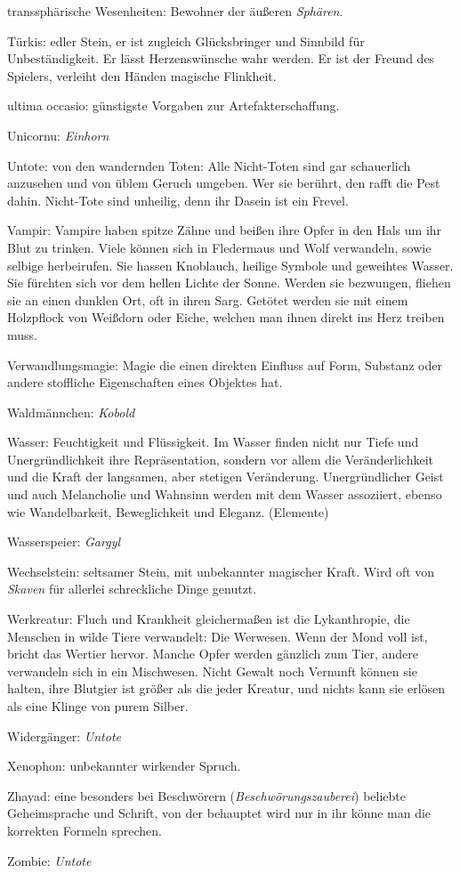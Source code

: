 \documentclass[a5paper,8pt]{book}
\begin{document}
\begin{small}
\begin{description}
 \item transsphärische Wesenheiten: Bewohner der äußeren \textit{Sphären}.
 \item Türkis: edler Stein, er ist zugleich Glücks­bringer und Sinnbild für Unbeständigkeit. Er lässt Herzenswünsche wahr werden. Er ist der Freund des Spielers, verleiht den Händen magische Flinkheit.
 \item ultima occasio: günstigste Vorgaben zur Artefakt­erschaffung.
 \item Unicornu: \textit{Einhorn}
 \item Untote: von den wandernden Toten: Alle Nicht-Toten sind gar schauerlich anzusehen und von üblem Geruch umgeben. Wer sie berührt, den rafft die Pest dahin. Nicht-Tote sind unheilig, denn ihr Dasein ist ein Frevel.
 \item Vampir: Vampire haben spitze Zähne und beißen ihre Opfer in den Hals um ihr Blut zu trinken. Viele können sich in Fledermaus und Wolf verwandeln, sowie selbige herbeirufen. Sie hassen Knoblauch, heilige Symbole und geweihtes Wasser. Sie fürchten sich vor dem hellen Lichte der Sonne. Werden sie bezwungen, fliehen sie an einen dunklen Ort, oft in ihren Sarg. Getötet werden sie mit einem Holzpflock von Weißdorn oder Eiche, welchen man ihnen direkt ins Herz treiben muss.
 \item Verwandlungsmagie: Magie die einen direkten Einfluss auf Form, Substanz oder andere stoffliche Eigenschaften eines Objektes hat.
 \item Waldmännchen: \textit{Kobold}
 \item Wasser: Feuchtigkeit und Flüssigkeit. Im Wasser finden nicht nur Tiefe und Unergründlichkeit ihre Re­präsen­tation, sondern vor allem die Veränderlichkeit und die Kraft der langsamen, aber stetigen Veränderung. Unergründlicher Geist und auch Melancholie und Wahn­sinn werden mit dem Wasser assoziiert, ebenso wie Wandelbarkeit, Beweglichkeit und Eleganz. (\textit{}Elemente)
 \item Wasserspeier: \textit{Gargyl}
 \item Wechselstein: seltsamer Stein, mit unbekannter magischer Kraft. Wird oft von \textit{Skaven} für allerlei schreckliche Dinge genutzt.
 \item Werkreatur: Fluch und Krankheit gleichermaßen ist die Lykanthropie, die Menschen in wilde Tiere ver­wandelt: Die Werwesen. Wenn der Mond voll ist, bricht das Wertier hervor. Manche Opfer werden gänzlich zum Tier, andere verwandeln sich in ein Mischwesen. Nicht Gewalt noch Vernunft können sie halten, ihre Blutgier ist größer als die jeder Kreatur, und nichts kann sie erlösen als eine Klinge von purem Silber.
 \item Widergänger: \textit{Untote}
 \item Xenophon: unbekannter wirkender Spruch.
 \item Zhayad: eine besonders bei Beschwörern (\textit{Be­schwörungs­zauberei}) beliebte Geheimsprache und Schrift, von der behauptet wird nur in ihr könne man die 
korrekten Formeln sprechen. 
 \item Zombie: \textit{Untote}


\end{description}
\end{small}
\end{document}
